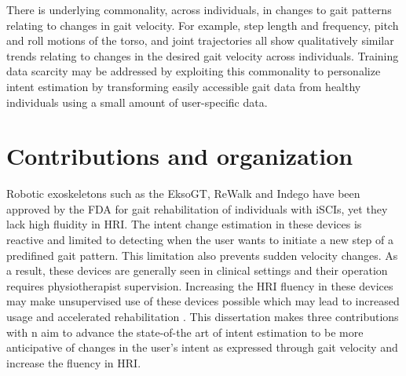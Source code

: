 There is underlying commonality, across individuals, in changes to gait patterns relating to changes in gait velocity. For example, step length and frequency, pitch and roll motions of the torso, and joint trajectories all show qualitatively similar trends relating to changes in the desired gait velocity across individuals. Training data scarcity may be addressed by exploiting this commonality to personalize intent estimation by transforming easily accessible gait data from healthy individuals using a small amount of user-specific data.

\section{Contributions and organization}

Robotic exoskeletons such as the EksoGT, ReWalk and Indego have been approved by the FDA for gait rehabilitation of individuals with iSCIs, yet they lack high fluidity in HRI. The intent change estimation in these devices is reactive and limited to detecting when the user wants to initiate a new step of a predifined gait pattern. This limitation also prevents sudden velocity changes. As a result, these devices are generally seen in clinical settings and their operation requires physiotherapist supervision. Increasing the HRI fluency in these devices may make unsupervised use of these devices possible which may lead to increased usage and accelerated rehabilitation \cite{hidler2011role}. This dissertation makes three contributions with n aim to advance the state-of-the art of intent estimation to be more anticipative of changes in the user's intent as expressed through gait velocity and increase the fluency in HRI.

